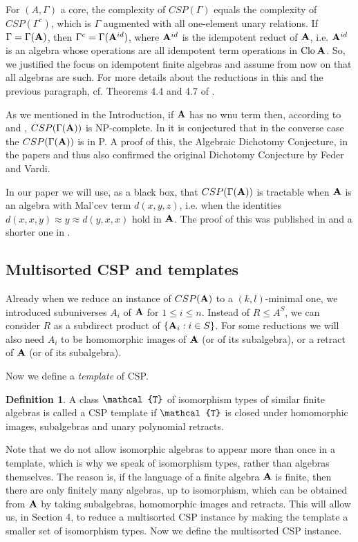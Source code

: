 \documentclass[11pt]{amsart}
\newcommand{\m}[1]{{\uppercase {\mathbf {#1}}}}
\newcommand{\vr}[1]{{\uppercase {\mathcal{#1}}}}
\newcommand{\clo}[1]{{\rm Clo\:\m #1}}
\theoremstyle{definition}
\newtheorem{df}[thm]{Definition}
\begin{document}
For $(A,\Gamma)$ a core, the complexity of $CSP(\Gamma)$ equals the complexity of $CSP(\Gamma^c)$, which is $\Gamma$ augmented with all one-element unary relations. If $\Gamma=\Gamma(\m a)$, then $\Gamma^c=\Gamma(\m a^{id})$, where $\m a^{id}$ is the idempotent reduct of $\m a$, i.e. $\m a^{id}$ is an algebra whose operations are all idempotent term operations in $\clo{a}$. So, we justified the focus on idempotent finite algebras and assume from now on that all algebras are such. For more details about the reductions in this and the previous paragraph, cf. Theorems 4.4 and 4.7 of \cite{BJK}.

As we mentioned in the Introduction, if $\m a$ has no wnu term then, according to \cite{BJK} and \cite{MM}, $CSP(\Gamma(\m a))$ is NP-complete. In \cite{BJK} it is conjectured that in the converse case the $CSP(\Gamma(\m a))$ is in P. A proof of this, the Algebraic Dichotomy Conjecture, in the papers \cite{Zhdich} and \cite{Budich} thus also confirmed the original Dichotomy Conjecture by Feder and Vardi.

In our paper we will use, as a black box, that $CSP(\Gamma(\m a))$ is tractable when $\m a$ is an algebra with Mal'cev term $d(x,y,z)$, i.e. when the identities $d(x,x,y)\approx y\approx d(y,x,x)$ hold in $\m a$. The proof of this was published in \cite{BulatovMalcev} and a shorter one in \cite{BulatovDalmau}.

\subsection{Multisorted CSP and templates} Already when we reduce an instance of $CSP(\m a)$ to a $(k,l)$-minimal one, we introduced subuniverses $A_i$ of $\m a$ for $1\leq i\leq n$. Instead of $R\leq A^S$, we can consider $R$ as a subdirect product of $\{\m a_i:i\in S\}$. For some reductions we will also need $A_i$ to be homomorphic images of $\m a$ (or of its subalgebra), or a retract of $\m a$ (or of its subalgebra).

Now we define a {\em template} of CSP.

\begin{df}\label{CSPtemplate}
A class $\vr t$ of isomorphism types of similar finite algebras is called a CSP template if $\vr t$ is closed under homomorphic images, subalgebras and unary polynomial retracts. 
\end{df}

Note that we do not allow isomorphic algebras to appear more than once in a template, which is why we speak of isomorphism types, rather than algebras themselves. The reason is, if the language of a finite algebra $\m a$ is finite, then there are only finitely many algebras, up to isomorphism, which can be obtained from $\m a$ by taking subalgebras, homomorphic images and retracts. This will allow us, in Section 4, to reduce a multisorted CSP instance by making the template a smaller set of isomorphism types. Now we define the multisorted CSP instance.
\end{document}

